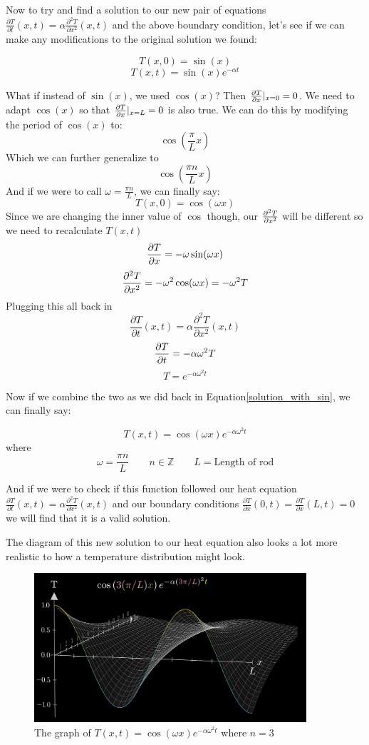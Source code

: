 \documentclass{report}
\newcommand{\heatequation}[0]{\frac{\partial T}{\partial t}(x,t) = \alpha \frac{\partial^2 T}{\partial x^2}(x,t)}
\begin{document}
Now to try and find a solution to our new pair of equations $\heatequation$ and the above boundary condition, let's see if we can make any modifications to the original solution we found:

\[T(x,0) = \sin(x) \]
\[ T(x,t) = \sin(x)e^{-\alpha t} \]

What if instead of $\sin(x)$, we used $\cos(x)$? Then $\pdv{T}{x}|_{x=0} = 0$. We need to adapt 
$\cos(x)$ so that $\pdv{T}{x}|_{x=L} = 0$ is also true. We can do this by modifying the period of 
$\cos(x)$ to:
\[\cos(\frac{\pi}{L}x)\]
Which we can further generalize to 
\[\cos(\frac{\pi n}{L}x)\]
And if we were to call $\omega = \frac{\pi n}{L}$, we can finally say:
\[T(x,0) = \cos(\omega x) \]
Since we are changing the inner value of $\cos$ though, our $\pdv[2]{T}{x}$ will be different so we need to recalculate 
$T(x,t)$
\[ \pdv{T}{x} = -\omega\sin(\omega x) \]
\[ \pdv[2]{T}{x} = -\omega^2\cos(\omega x) = -\omega^2T\]
Plugging this all back in
\[\heatequation\]
\[\pdv{T}{t} = -\alpha\omega^2T \]
\[ T = e^{-\alpha\omega^2t} \]

Now if we combine the two as we did back in Equation\ref{solution_with_sin}, we can finally say:


\begin{equation} \label{soln_with_cos}
     T(x,t) = \cos(\omega x)e^{-\alpha\omega^2t} 
\end{equation}
where
\[ \omega = \frac{\pi n}{L} \qquad n \in \mathbb{Z} \qquad L = \textrm{Length of rod} \]

And if we were to check if this function followed our heat equation $\heatequation$ and our boundary
conditions $\frac{\partial T}{\partial x}(0,t) = \frac{\partial T}{\partial x}(L,t) = 0 $ we will find that it is a valid solution. 

The diagram of this new solution to our heat equation also looks a lot more realistic to how a temperature distribution
might look. 

\begin{figure}[H]
    \centering
    \includegraphics[width=0.9\textwidth]{images/cosx_temperature_function.png}
    \caption{The graph of $T(x,t) = \cos(\omega x)e^{-\alpha\omega^2t}$ where $n = 3$}
\end{figure}
\end{document}
